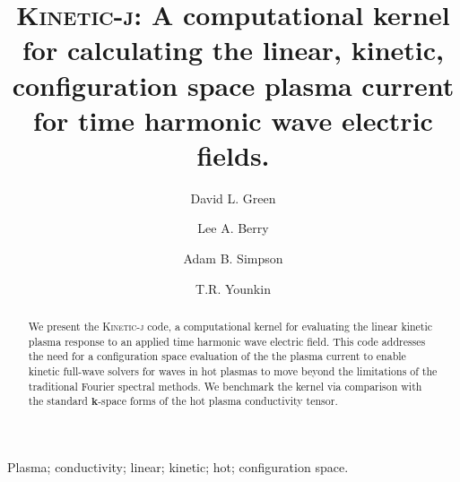\documentclass[final,5p,times,twocolumn]{elsarticle}
\renewcommand{\vec}[1]{\mathbf{#1}}
\newcommand{\kj}{\textsc{Kinetic-j}\xspace}
\begin{document}
\begin{frontmatter}



\title{\kj: A computational kernel for calculating the linear, kinetic, configuration space plasma current for time harmonic wave electric fields.}


\author[a]{David L. Green}
\author[a,b]{Lee A. Berry}
\author[b]{Adam B. Simpson}
\author[a,c]{T.R. Younkin}

\address[a]{Oak Ridge National Laboratory, 1 Bethel Valley Rd., Oak Ridge, Tennessee 37831, USA}
\address[b]{XCEL Engineering, 1066 Commerce Park Dr., Oak Ridge, Tennessee 37830, USA}
\address[c]{Universtity of Tennessee, Knoxville, Tennessee 37996, USA}

\begin{abstract}
We present the \kj code, a computational kernel for evaluating the linear kinetic plasma response to an applied time harmonic wave electric field. This code addresses the need for a configuration space evaluation of the the plasma current to enable kinetic full-wave solvers for waves in hot plasmas to move beyond the limitations of the traditional Fourier spectral methods. We benchmark the kernel via comparison with the standard $\vec{k}$-space forms of the hot plasma conductivity tensor. 
\end{abstract}

\begin{keyword}
Plasma; conductivity; linear; kinetic; hot; configuration space.

\end{keyword}

\end{frontmatter}
\end{document}
